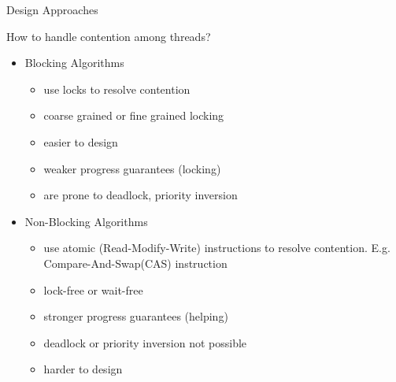 \begin{frame}{Design Approaches}
\begin{center}
\Large How to handle contention among threads?
\end{center}
\pause
\begin{itemize}
\item<2-> \Large Blocking Algorithms
\begin{itemize}
\item<3-> use locks to resolve contention
\item<3-> coarse grained or fine grained locking
\item<3->  {\color{black!50!green} easier to design}
\item<3->  {\color{red}weaker progress guarantees} (locking) 
\item<3->  {\color{red}are prone to deadlock, priority inversion}
\end{itemize}
\phantom{hello world}
\item<2-> \Large Non-Blocking Algorithms
\begin{itemize}
\item<4->  use atomic (Read-Modify-Write) instructions to resolve contention. E.g. Compare-And-Swap(CAS) instruction
\item<4-> lock-free or wait-free
\item<4-> {\color{black!50!green}stronger progress guarantees} (helping)
\item<4-> {\color{black!50!green}deadlock or priority inversion not possible}
\item<4-> {\color{red}harder to design}
\end{itemize}
\end{itemize}
\end{frame}
